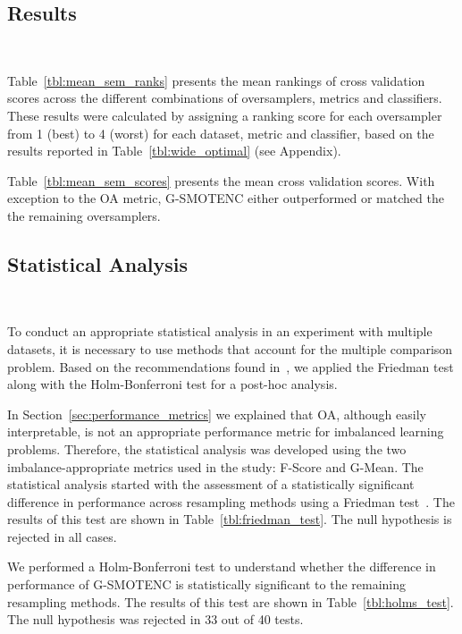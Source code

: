 \documentclass[parskip=full]{scrartcl}
\begin{document}
\subsection{Results}~\label{sec:results}

Table~\ref{tbl:mean_sem_ranks} presents the mean rankings of cross validation
scores across the different combinations of oversamplers, metrics and
classifiers. These results were calculated by assigning a ranking score for
each oversampler from 1 (best) to 4 (worst) for each dataset, metric and
classifier, based on the results reported in Table~\ref{tbl:wide_optimal} (see
Appendix).



Table~\ref{tbl:mean_sem_scores} presents the mean cross validation scores.
With exception to the OA metric, G-SMOTENC either outperformed or matched the
the remaining oversamplers.



\subsection{Statistical Analysis}~\label{sec:statistical_analysis}

To conduct an appropriate statistical analysis in an experiment with multiple
datasets, it is necessary to use methods that account for the multiple
comparison problem. Based on the recommendations found in~\cite{Demsar2006},
we applied the Friedman test along with the Holm-Bonferroni test for a
post-hoc analysis.

In Section~\ref{sec:performance_metrics} we
explained that OA, although easily interpretable, is not an appropriate
performance metric for imbalanced learning problems. Therefore, the
statistical analysis was developed using the two imbalance-appropriate metrics
used in the study: F-Score and G-Mean. The statistical analysis started with
the assessment of a statistically significant difference in performance across
resampling methods using a Friedman test~\cite{friedman1937use}. The results
of this test are shown in Table~\ref{tbl:friedman_test}. The null hypothesis
is rejected in all cases.



We performed a Holm-Bonferroni test to understand whether the difference in
performance of G-SMOTENC is statistically significant to the remaining
resampling methods. The results of this test are shown in
Table~\ref{tbl:holms_test}. The null hypothesis was rejected in 33 out of 40
tests.
\end{document}
